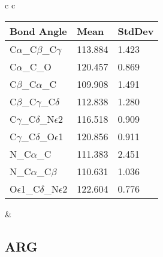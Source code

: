 \begin{longtable}{ c c }
\begin{tabular}{ l l l }
  Bond Angle   & Mean     & StdDev \\ \midrule
  C$\alpha$\_C$\beta$\_C$\gamma$ & 113.884 & 1.423\\
  C$\alpha$\_C\_O & 120.457 & 0.869\\
  C$\beta$\_C$\alpha$\_C & 109.908 & 1.491\\
  C$\beta$\_C$\gamma$\_C$\delta$ & 112.838 & 1.280\\
  C$\gamma$\_C$\delta$\_N$\epsilon$2 & 116.518 & 0.909\\
  C$\gamma$\_C$\delta$\_O$\epsilon$1 & 120.856 & 0.911\\
  N\_C$\alpha$\_C & 111.383 & 2.451\\
  N\_C$\alpha$\_C$\beta$ & 110.631 & 1.036\\
  O$\epsilon$1\_C$\delta$\_N$\epsilon$2 & 122.604 & 0.776\\
  \bottomrule
  \end{tabular}
  &
  \\
  
\end{longtable}    

\newpage
\subsection{ARG}

